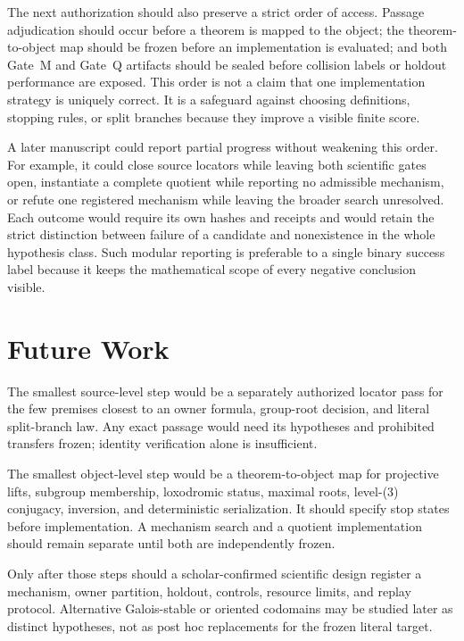 \documentclass[11pt,a4paper]{article}
\begin{document}
The next authorization should also preserve a strict order of access. Passage adjudication should occur before a theorem is mapped to the object; the theorem-to-object map should be frozen before an implementation is evaluated; and both Gate~M and Gate~Q artifacts should be sealed before collision labels or holdout performance are exposed. This order is not a claim that one implementation strategy is uniquely correct. It is a safeguard against choosing definitions, stopping rules, or split branches because they improve a visible finite score.

A later manuscript could report partial progress without weakening this order. For example, it could close source locators while leaving both scientific gates open, instantiate a complete quotient while reporting no admissible mechanism, or refute one registered mechanism while leaving the broader search unresolved. Each outcome would require its own hashes and receipts and would retain the strict distinction between failure of a candidate and nonexistence in the whole hypothesis class. Such modular reporting is preferable to a single binary success label because it keeps the mathematical scope of every negative conclusion visible.

\section{Future Work}

The smallest source-level step would be a separately authorized locator pass for the few premises closest to an owner formula, group-root decision, and literal split-branch law. Any exact passage would need its hypotheses and prohibited transfers frozen; identity verification alone is insufficient.

The smallest object-level step would be a theorem-to-object map for projective lifts, subgroup membership, loxodromic status, maximal roots, level-(3) conjugacy, inversion, and deterministic serialization. It should specify stop states before implementation. A mechanism search and a quotient implementation should remain separate until both are independently frozen.

Only after those steps should a scholar-confirmed scientific design register a mechanism, owner partition, holdout, controls, resource limits, and replay protocol. Alternative Galois-stable or oriented codomains may be studied later as distinct hypotheses, not as post hoc replacements for the frozen literal target.
\end{document}
